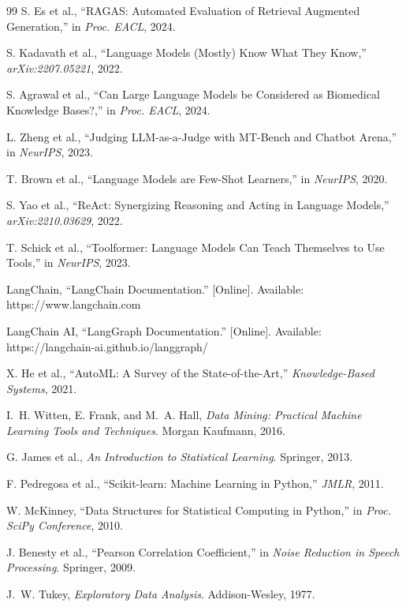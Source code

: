 \documentclass[10pt,conference]{IEEEtran}
\begin{document}
\begin{thebibliography}{99}
S. Es et al., “RAGAS: Automated Evaluation of Retrieval Augmented Generation,” in \textit{Proc. EACL}, 2024.

S. Kadavath et al., “Language Models (Mostly) Know What They Know,” \textit{arXiv:2207.05221}, 2022.

S. Agrawal et al., “Can Large Language Models be Considered as Biomedical Knowledge Bases?,” in \textit{Proc. EACL}, 2024.

L. Zheng et al., “Judging LLM-as-a-Judge with MT-Bench and Chatbot Arena,” in \textit{NeurIPS}, 2023.

T. Brown et al., “Language Models are Few-Shot Learners,” in \textit{NeurIPS}, 2020.

S. Yao et al., “ReAct: Synergizing Reasoning and Acting in Language Models,” \textit{arXiv:2210.03629}, 2022.

T. Schick et al., “Toolformer: Language Models Can Teach Themselves to Use Tools,” in \textit{NeurIPS}, 2023.

LangChain, “LangChain Documentation.” [Online]. Available: https://www.langchain.com

LangChain AI, “LangGraph Documentation.” [Online]. Available: https://langchain-ai.github.io/langgraph/

X. He et al., “AutoML: A Survey of the State-of-the-Art,” \textit{Knowledge-Based Systems}, 2021.

I.~H. Witten, E. Frank, and M.~A. Hall, \textit{Data Mining: Practical Machine Learning Tools and Techniques}. Morgan Kaufmann, 2016.

G. James et al., \textit{An Introduction to Statistical Learning}. Springer, 2013.

F. Pedregosa et al., “Scikit-learn: Machine Learning in Python,” \textit{JMLR}, 2011.

W. McKinney, “Data Structures for Statistical Computing in Python,” in \textit{Proc. SciPy Conference}, 2010.

J. Benesty et al., “Pearson Correlation Coefficient,” in \textit{Noise Reduction in Speech Processing}. Springer, 2009.

J.~W. Tukey, \textit{Exploratory Data Analysis}. Addison-Wesley, 1977.

\end{thebibliography}
\end{document}
